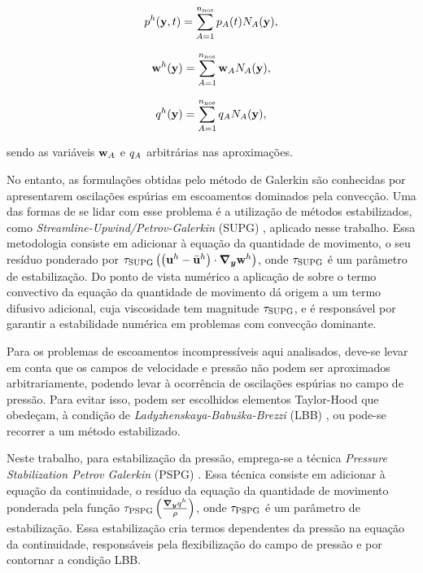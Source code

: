 \documentclass[tese_patricia]{subfiles}%
\begin{document}
\begin{align}
p^h(\mathbf{y},t)  = \sum_{A = 1}^{n_{\mathrm{nos}}} p_{A}(t)N_{A}(\mathbf{y}),\label{eq:interp_press} 
\end{align}

\begin{align}
\mathbf{w}^h(\mathbf{y})  = \sum_{A = 1}^{n_{\mathrm{nos}}} \mathbf{w}_{A}N_{A}(\mathbf{y}), \label{eq:interp_utest}
\end{align}

\begin{align}
q^h(\mathbf{y})  = \sum_{A = 1}^{n_{\mathrm{nos}}} q_{A}N_{A}(\mathbf{y}), \label{eq:inter_ptest} 
\end{align}

\noindent sendo as variáveis $\mathbf{w}_{A}$ e $q_{A}$ arbitrárias nas aproximações.

No entanto, as formulações obtidas pelo método de Galerkin são conhecidas por apresentarem oscilações espúrias em escoamentos dominados pela convecção. Uma das formas de se lidar com esse problema é a utilização de métodos estabilizados, como \textit{Streamline-Upwind/Petrov-Galerkin} (SUPG) \cite{BrooksH:1982, HughesT:1984}, aplicado nesse trabalho. Essa metodologia consiste em adicionar à equação da quantidade de movimento, o seu resíduo ponderado por $\tau_{\mathrm{SUPG}} \left(\left(\mathbf{u}^h - \bar{\mathbf{u}}^h \right) \cdot \boldsymbol{\nabla_y} \mathbf{w}^h\right)$, onde $\tau_{\mathrm{SUPG}}$ é um parâmetro de estabilização. Do ponto de vista numérico a aplicação de  sobre o termo convectivo da equação da quantidade de movimento dá origem a um termo difusivo adicional, cuja viscosidade tem magnitude $\tau_{\mathrm{SUPG}}$, e é responsável por garantir a estabilidade numérica em problemas com convecção dominante.

Para os problemas de escoamentos incompressíveis aqui analisados, deve-se levar em conta que os campos de velocidade e pressão não podem ser aproximados arbitrariamente, podendo levar à ocorrência de oscilações espúrias no campo de pressão. Para evitar isso, podem ser escolhidos elementos Taylor-Hood que obedeçam, à condição de \textit{Ladyzhenskaya-Babuška-Brezzi} (LBB) \cite{BrezziF:1991,ZienkiewiczTN:2005,StrangF:2008}, ou pode-se recorrer a um método estabilizado. 

Neste trabalho, para estabilização da pressão, emprega-se a técnica \textit{Pressure Stabilization Petrov Galerkin} (PSPG)   \cite{HughesFB:1986,TezduyarMRS:1992a}. Essa técnica consiste em adicionar à equação da continuidade, o resíduo da equação da quantidade de movimento ponderada pela função $\tau_{\mathrm{PSPG}} \left(\frac{\boldsymbol{\nabla_y} q^h}{\rho}\right)$, onde $\tau_{\mathrm{PSPG}}$ é um parâmetro de estabilização. Essa estabilização cria termos dependentes da pressão na equação da continuidade, responsáveis pela flexibilização do campo de pressão e por contornar a condição LBB.
\end{document}
